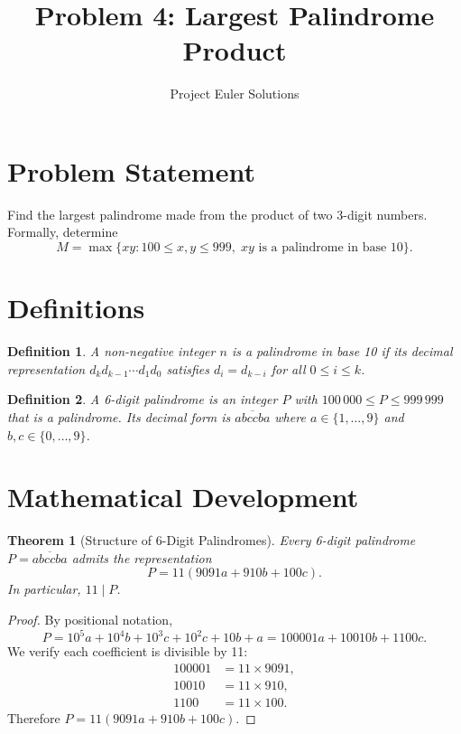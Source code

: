 \documentclass[11pt]{article}
\title{Problem 4: Largest Palindrome Product}
\author{Project Euler Solutions}
\date{}
\newtheorem{theorem}{Theorem}
\newtheorem{definition}{Definition}
\begin{document}
\maketitle

\section{Problem Statement}

Find the largest palindrome made from the product of two 3-digit numbers. Formally, determine
\[
M = \max\bigl\{xy : 100 \le x,y \le 999,\; xy \text{ is a palindrome in base 10}\bigr\}.
\]

\section{Definitions}

\begin{definition}
A non-negative integer $n$ is a \emph{palindrome in base 10} if its decimal representation $d_k d_{k-1} \cdots d_1 d_0$ satisfies $d_i = d_{k-i}$ for all $0 \le i \le k$.
\end{definition}

\begin{definition}
A \emph{6-digit palindrome} is an integer $P$ with $100\,000 \le P \le 999\,999$ that is a palindrome. Its decimal form is $\overline{abccba}$ where $a \in \{1,\dots,9\}$ and $b,c \in \{0,\dots,9\}$.
\end{definition}

\section{Mathematical Development}

\begin{theorem}[Structure of 6-Digit Palindromes]\label{thm:div11}
Every 6-digit palindrome $P = \overline{abccba}$ admits the representation
\[
P = 11(9091a + 910b + 100c).
\]
In particular, $11 \mid P$.
\end{theorem}

\begin{proof}
By positional notation,
\[
P = 10^5 a + 10^4 b + 10^3 c + 10^2 c + 10 b + a = 100001a + 10010b + 1100c.
\]
We verify each coefficient is divisible by 11:
\begin{align*}
100001 &= 11 \times 9091, \\
10010  &= 11 \times 910, \\
1100   &= 11 \times 100.
\end{align*}
Therefore $P = 11(9091a + 910b + 100c)$.
\end{proof}
\end{document}
